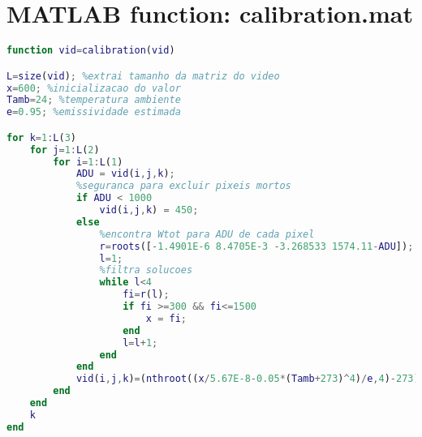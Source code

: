 \chapter{MATLAB function: calibration.mat}
\label{ap:a}
\begin{lstlisting}[language=matlab]
function vid=calibration(vid)

L=size(vid); %extrai tamanho da matriz do video
x=600; %inicializacao do valor
Tamb=24; %temperatura ambiente
e=0.95; %emissividade estimada

for k=1:L(3)
    for j=1:L(2)
        for i=1:L(1)
            ADU = vid(i,j,k);
            %seguranca para excluir pixeis mortos
            if ADU < 1000
                vid(i,j,k) = 450;
            else
                %encontra Wtot para ADU de cada pixel
                r=roots([-1.4901E-6 8.4705E-3 -3.268533 1574.11-ADU]);
                l=1;
                %filtra solucoes
                while l<4
                    fi=r(l);
                    if fi >=300 && fi<=1500
                        x = fi;
                    end
                    l=l+1;
                end
            end
            vid(i,j,k)=(nthroot((x/5.67E-8-0.05*(Tamb+273)^4)/e,4)-273);
        end
    end
    k
end
\end{lstlisting}